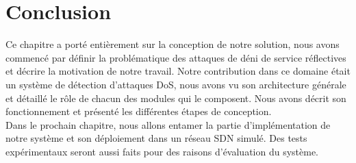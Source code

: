 \section{Conclusion}
Ce chapitre a porté entièrement sur la conception de notre solution, nous avons commencé par définir la problématique des attaques de déni de service réflectives et décrire la motivation de notre travail. Notre contribution dans ce domaine était un système de détection d'attaques DoS, nous avons vu son architecture générale et détaillé le rôle de chacun des modules qui le composent. Nous avons décrit son fonctionnement et présenté les différentes étapes de conception.\\

\noindent Dans le prochain chapitre, nous allons entamer la partie d'implémentation de notre système et son déploiement dans un réseau SDN simulé. Des tests expérimentaux seront aussi faits pour des raisons d'évaluation du système.
